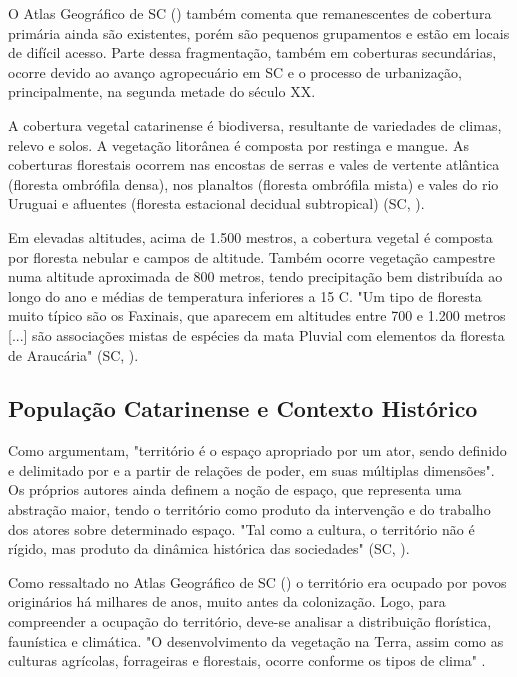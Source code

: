 \indent  O Atlas Geográfico de \acrlong{SC} (\citeyear{AtlasSCnatureza}) também comenta que remanescentes de cobertura primária ainda são existentes, porém são pequenos grupamentos e estão em locais de difícil acesso. Parte dessa fragmentação, também em coberturas secundárias, ocorre devido ao avanço agropecuário em \acrlong{SC} e o  processo de urbanização, principalmente, na segunda metade do século XX.

\indent A cobertura vegetal catarinense é biodiversa, resultante de variedades de climas, relevo e solos. A vegetação litorânea é composta por restinga e mangue. As coberturas florestais ocorrem nas encostas de serras e vales de vertente atlântica (floresta ombrófila densa), nos planaltos (floresta ombrófila mista) e vales do rio Uruguai e afluentes (floresta estacional decidual subtropical) (\acrlong{SC}, \citeyear{AtlasSCnatureza}).

\indent Em elevadas altitudes, acima de 1.500 mestros, a cobertura vegetal é composta por floresta nebular e campos de altitude. Também ocorre vegetação campestre numa altitude aproximada de 800 metros, tendo precipitação bem distribuída ao longo do ano e médias de temperatura inferiores a 15 C. "Um tipo de floresta muito típico são os Faxinais, que aparecem em altitudes entre 700 e 1.200 metros [...] são associações mistas de espécies da mata Pluvial com elementos da floresta de Araucária" (\acrlong{SC}, \citeyear{AtlasSCnatureza}).

\subsection{População Catarinense e Contexto Histórico}

\indent Como  argumentam, "território é o espaço apropriado por um ator, sendo definido e delimitado por e a partir de relações de poder, em suas múltiplas dimensões". Os próprios autores ainda definem a noção de espaço, que representa uma abstração maior, tendo o território como produto da intervenção e do trabalho dos atores sobre determinado espaço. "Tal como a cultura, o território não é rígido, mas produto da dinâmica histórica das sociedades" (\acrlong{SC}, \citeyear{AtlasSCpopulacao}).

\indent Como ressaltado no Atlas Geográfico de \acrlong{SC} (\citeyear{AtlasSCpopulacao}) o território era ocupado por povos originários há milhares de anos, muito antes da colonização. Logo, para compreender a ocupação do território, deve-se analisar a distribuição florística, faunística e climática. "O desenvolvimento da vegetação na Terra, assim como as culturas agrícolas, forrageiras e florestais, ocorre conforme os tipos de clima" \cite{AtlasClimaticoSul}.

